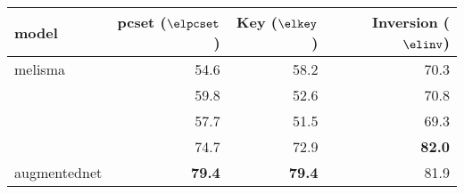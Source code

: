 \begin{tabular}{l|rrr}
model          & \gls{pcset} ($\elpcset$) & Key ($\elkey$) & Inversion ($\elinv$)  \\ \hline
\gls{melisma}        & 54.6 & 58.2 & 70.3 \\
\textcite{chen2021attend}       & 59.8 & 52.6 & 70.8 \\
\textcite{mcleod2021modular}     & 57.7 & 51.5 & 69.3 \\
\textcite{micchi2021deep}     & 74.7 & 72.9 & \textbf{82.0} \\
\gls{augmentednet} & \textbf{79.4} & \textbf{79.4} & 81.9
\end{tabular}
